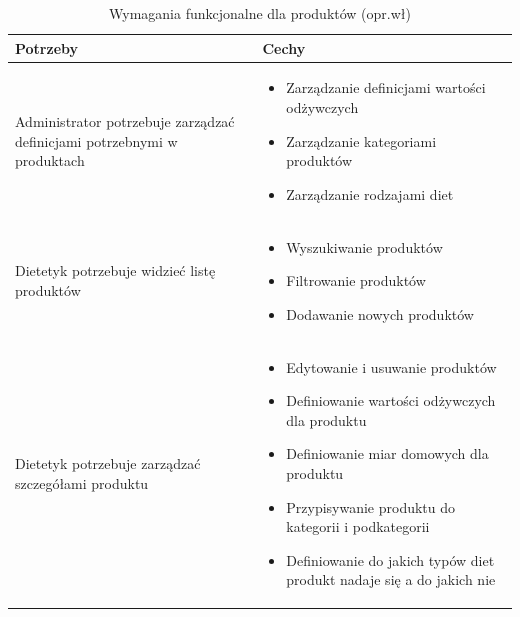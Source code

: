 \begin{minipage}{\textwidth}
    \begin{table}[H]
        \centering\caption{Wymagania funkcjonalne dla produktów (opr.wł)\label{tabela:wymaganiaFunkcjonalneProdukty}}
        \begin{tabular}{|p{}|p{}|}
            \hline
            Potrzeby & Cechy \\

            \hline
            Administrator potrzebuje zarządzać definicjami potrzebnymi w produktach &
            \begin{itemize}
                \item Zarządzanie definicjami wartości odżywczych
                \item Zarządzanie kategoriami produktów
                \item Zarządzanie rodzajami diet
            \end{itemize} \\
            \hline
            Dietetyk potrzebuje widzieć listę produktów &
            \begin{itemize}
                \item Wyszukiwanie produktów
                \item Filtrowanie produktów
                \item Dodawanie nowych produktów
            \end{itemize} \\
            \hline
            Dietetyk potrzebuje zarządzać szczegółami produktu &
            \begin{itemize}
                \item Edytowanie i usuwanie produktów
                \item Definiowanie wartości odżywczych dla produktu
                \item Definiowanie miar domowych dla produktu
                \item Przypisywanie produktu do kategorii i podkategorii
                \item Definiowanie do jakich typów diet produkt nadaje się a do jakich nie
            \end{itemize} \\
            \hline
        \end{tabular}
    \end{table}
\end{minipage}

